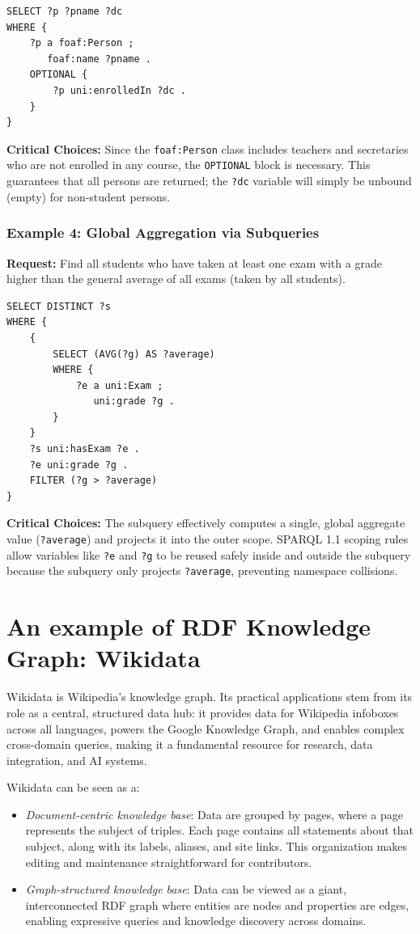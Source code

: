 \begin{lstlisting}
SELECT ?p ?pname ?dc
WHERE {
    ?p a foaf:Person ;
       foaf:name ?pname .
    OPTIONAL {
        ?p uni:enrolledIn ?dc .
    }
}
\end{lstlisting}
\textbf{Critical Choices:} 
Since the \texttt{foaf:Person} class includes teachers and secretaries who are not enrolled in any course, the \texttt{OPTIONAL} block is necessary. This guarantees that all persons are returned; the \texttt{?dc} variable will simply be unbound (empty) for non-student persons.

\subsubsection*{Example 4: Global Aggregation via Subqueries}
\textbf{Request:} Find all students who have taken at least one exam with a grade higher than the general average of all exams (taken by all students).

\begin{lstlisting}
SELECT DISTINCT ?s
WHERE {
    {
        SELECT (AVG(?g) AS ?average)
        WHERE {
            ?e a uni:Exam ;
               uni:grade ?g .
        }
    }
    ?s uni:hasExam ?e .
    ?e uni:grade ?g .
    FILTER (?g > ?average)
}
\end{lstlisting}
\textbf{Critical Choices:} 
The subquery effectively computes a single, global aggregate value (\texttt{?average}) and projects it into the outer scope. SPARQL 1.1 scoping rules allow variables like \texttt{?e} and \texttt{?g} to be reused safely inside and outside the subquery because the subquery only projects \texttt{?average}, preventing namespace collisions.

\section{An example of RDF Knowledge Graph: Wikidata}
Wikidata is Wikipedia's knowledge graph. Its practical applications stem from its role as a central, structured data hub: it provides data for Wikipedia infoboxes across all languages, powers the Google Knowledge Graph, and enables complex cross-domain queries, making it a fundamental resource for research, data integration, and AI systems.

Wikidata can be seen as a:
\begin{itemize}
    \item \emph{Document-centric knowledge base}: Data are grouped by pages, where a page represents the subject of triples. Each page contains all statements about that subject, along with its labels, aliases, and site links. This organization makes editing and maintenance straightforward for contributors.
    \item \emph{Graph-structured knowledge base}: Data can be viewed as a giant, interconnected RDF graph where entities are nodes and properties are edges, enabling expressive queries and knowledge discovery across domains.
\end{itemize}

